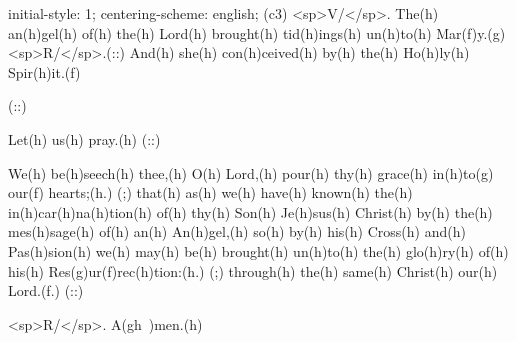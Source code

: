 initial-style: 1;
centering-scheme: english;
(c3) <sp>V/</sp>. The(h) an(h)gel(h) of(h) the(h) Lord(h) brought(h) tid(h)ings(h) un(h)to(h) Mar(f)y.(g) <sp>R/</sp>.(::) And(h) she(h) con(h)ceived(h) by(h) the(h) Ho(h)ly(h) Spir(h)it.(f) 

(::)

Let(h) us(h) pray.(h) (::)

We(h) be(h)seech(h) thee,(h) O(h) Lord,(h) pour(h) thy(h) grace(h) in(h)to(g) our(f) hearts;(h.) (;) that(h) as(h) we(h) have(h) known(h) the(h) in(h)car(h)na(h)tion(h) of(h) thy(h) Son(h) Je(h)sus(h) Christ(h) by(h) the(h) mes(h)sage(h) of(h) an(h) An(h)gel,(h) so(h) by(h) his(h) Cross(h) and(h) Pas(h)sion(h) we(h) may(h) be(h) brought(h) un(h)to(h) the(h) glo(h)ry(h) of(h) his(h) Res(g)ur(f)rec(h)tion:(h.) (;) through(h) the(h) same(h) Christ(h) our(h) Lord.(f.) (::)

<sp>R/</sp>. A(gh~)men.(h)